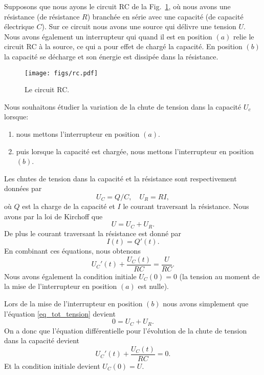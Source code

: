 \documentclass[a4paper,12pt]{book}
\renewcommand{\eqref}[1]{\ref{#1}}
\begin{document}
Supposons que nous ayons le circuit RC de la Fig.~\ref{fig_rc}, où nous avons une résistance (de résistance $R$) branchée en série avec une capacité 
(de capacité électrique $C$). Sur ce circuit nous avons une source qui délivre une tension $U$. Nous avons également un interrupteur qui 
quand il est en position $(a)$ relie le circuit RC à la source, ce qui a pour effet de chargé la capacité. En position $(b)$ 
la capacité se décharge et son énergie est dissipée dans la résistance.
\begin{figure}[htp]
\begin{center}
\texttt{[image: figs/rc.pdf]}
\caption{Le circuit RC.}\label{fig_rc}
\end{center}
\end{figure}
Nous souhaitons étudier la variation de la chute de tension dans la capacité $U_c$ lorsque:
\begin{enumerate}
 \item nous mettons l'interrupteur en position $(a)$.
 \item puis lorsque la capacité est chargée, nous mettons l'interrupteur en position $(b)$.
\end{enumerate}
Les chutes de tension dans la capacité et la résistance sont respectivement données par
\begin{equation}
 U_C=Q/C,\quad U_R=R I,
\end{equation}
où $Q$ est la charge de la capacité et $I$ le courant traversant la résistance. Nous avons par la loi de Kirchoff
que
\begin{equation}
 U=U_C+U_R.\label{eq_tot_tension}
\end{equation}
De plus le courant traversant la résistance est donné par 
\begin{equation}
 I(t)=Q'(t).
\end{equation}
En combinant ces équations, nous obtenons 
\begin{equation}
 U_C'(t)+\frac{U_C(t)}{RC}=\frac{U}{RC}.
\end{equation}
Nous avons également la condition initiale $U_C(0)=0$ (la tension au moment de la mise de l'interrupteur en position $(a)$ est nulle).

Lors de la mise de l'interrupteur en position $(b)$ nous avons simplement que l'équation \eqref{eq_tot_tension} devient
\begin{equation}
 0=U_C+U_R.\label{eq_tot_tension_0}
\end{equation}
On a donc que l'équation différentielle pour l'évolution de la chute de tension dans la capacité devient 
\begin{equation}
 U_C'(t)+\frac{U_C(t)}{RC}=0.
\end{equation}
Et la condition initiale devient $U_C(0)=U$.
\end{document}
